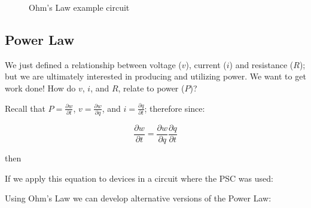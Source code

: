 \documentclass{handout}
\begin{document}
\begin{figure}
\centering
{}
\caption{Ohm's Law example circuit}
\label{fig: OhmsLawExampleSolution}
\end{figure}


\subsection{Power Law}
We just defined a relationship between voltage ($v$), current ($i$) and resistance ($R$); but we are ultimately interested in producing and utilizing power.  We want to get work done!  How do $v$, $i$, and $R$, relate to power ($P$)?

Recall that $P = \frac{\partial w}{\partial t}$,  $v = \frac{\partial w}{\partial q}$, and $i = \frac{\partial q}{\partial t}$; therefore since:

\begin{equation}
 \frac{\partial w}{\partial t} =  \frac{\partial w}{\partial q} \frac{\partial q}{\partial t}
\end{equation}

then


If we apply this equation to devices in a circuit where the PSC was used:


Using Ohm's Law we can develop alternative versions of the Power Law:

\end{document}
